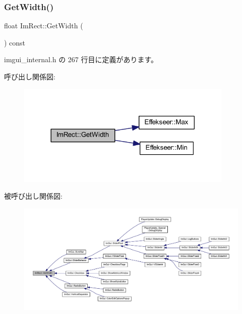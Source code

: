 \subsubsection{\texorpdfstring{Get\+Width()}{GetWidth()}}
{\footnotesize\ttfamily float Im\+Rect\+::\+Get\+Width (\begin{DoxyParamCaption}{ }\end{DoxyParamCaption}) const\hspace{0.3cm}{\ttfamily [inline]}}



 imgui\+\_\+internal.\+h の 267 行目に定義があります。

呼び出し関係図\+:\nopagebreak
\begin{figure}[H]
\begin{center}
\leavevmode
\includegraphics[width=293pt]{struct_im_rect_afa75cb8491f20901c96166d17dcddac4_cgraph}
\end{center}
\end{figure}
被呼び出し関係図\+:\nopagebreak
\begin{figure}[H]
\begin{center}
\leavevmode
\includegraphics[width=350pt]{struct_im_rect_afa75cb8491f20901c96166d17dcddac4_icgraph}
\end{center}
\end{figure}
\mbox{\label{struct_im_rect_a0af3bade3781e5e7c6afdf71ccfb0d43}} 
